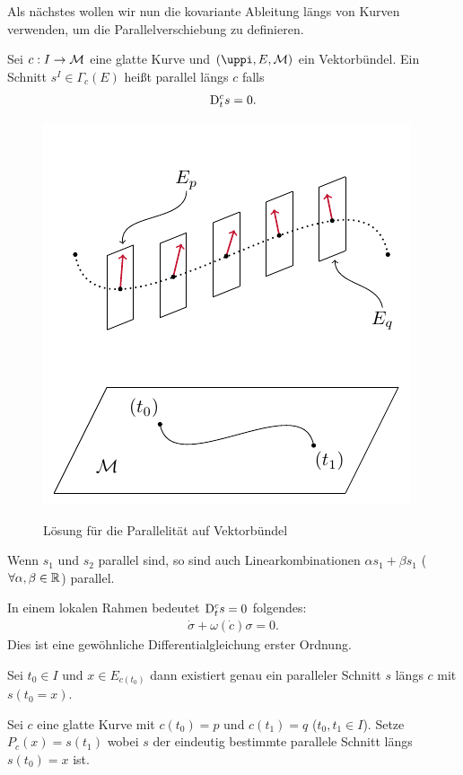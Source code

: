 Als nächstes wollen wir nun die kovariante Ableitung längs von Kurven verwenden, um die Parallelverschiebung zu definieren.
\begin{defs}[Parallelität]
Sei $c: I \to \mathcal{M}$ eine glatte Kurve und $(\pi, E, \mfk)$ ein Vektorbündel.
Ein Schnitt $s^I \in \Gamma_c (E)$ heißt parallel längs $c$ falls 
\begin{align}
\mathrm{D}^c_t s = 0.
\end{align}
\end{defs}
\begin{figure}[H]
\centering
\includegraphics[width=0.7\linewidth]{figures/tikz/parallel_shift_dgl.pdf}
\label{img:parallel_shift:dgl}
\caption{Lösung für die Parallelität auf Vektorbündel}
\end{figure} 
\begin{bem}
Wenn $s_1$ und $s_2$ parallel sind, so sind auch Linearkombinationen $\alpha s_1 + \beta s_1$ ($\forall \alpha, \beta \in \mathbb{R}$) parallel.
\end{bem}
In einem lokalen Rahmen bedeutet $\mathrm{D}^c_t s = 0$ folgendes:
\begin{align}
\dot{\sigma} + \omega(\dot{c}) \sigma = 0.
\end{align}
Dies ist eine gewöhnliche Differentialgleichung erster Ordnung.
\begin{lem}
Sei $t_0 \in I$ und $x \in E_{c(t_0)}$ dann existiert genau ein paralleler Schnitt $s$ längs $c$ mit $s(t_0 = x)$.
\end{lem}
Sei $c$ eine glatte Kurve mit $c(t_0) = p$ und $c(t_1)=q$ ($t_0, t_1 \in I$).
Setze $P_c(x) = s(t_1)$ wobei $s$ der eindeutig bestimmte parallele Schnitt längs $s(t_0) = x$ ist.
